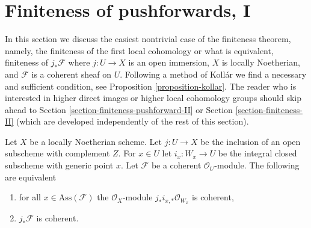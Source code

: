 \section{Finiteness of pushforwards, I}
\label{section-finiteness-pushforward}

\noindent
In this section we discuss the easiest nontrivial case of the
finiteness theorem, namely, the finiteness of the first local
cohomology or what is equivalent, finiteness of $j_*\mathcal{F}$
where $j : U \to X$ is an open immersion, $X$ is locally Noetherian, and
$\mathcal{F}$ is a coherent sheaf on $U$. Following a method of Koll\'ar
we find a necessary and sufficient condition, see
Proposition \ref{proposition-kollar}. The reader who is interested
in higher direct images or higher local cohomology groups should skip
ahead to Section \ref{section-finiteness-pushforward-II} or
Section \ref{section-finiteness-II} (which are developed
independently of the rest of this section).

\begin{lemma}
\label{lemma-check-finiteness-pushforward-on-associated-points}
Let $X$ be a locally Noetherian scheme. Let $j : U \to X$ be the inclusion
of an open subscheme with complement $Z$. For $x \in U$ let
$i_x : W_x \to U$ be the integral closed subscheme with generic point $x$.
Let $\mathcal{F}$ be a coherent $\mathcal{O}_U$-module.
The following are equivalent
\begin{enumerate}
\item for all $x \in \text{Ass}(\mathcal{F})$ the
$\mathcal{O}_X$-module $j_*i_{x, *}\mathcal{O}_{W_x}$ is coherent,
\item $j_*\mathcal{F}$ is coherent.
\end{enumerate}
\end{lemma}

